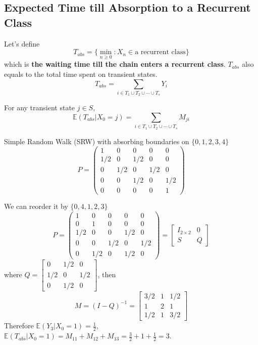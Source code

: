 \documentclass[11pt]{elegantbook}
\begin{document}
\subsection{Expected Time till Absorption to a Recurrent Class}
Let's define $$T_{abs}=\{\min_{n\geq 0}: X_n\in \text{a recurrent class}\}$$
which is \textbf{the waiting time till the chain enters a recurrent class}.
$T_{abs}$ also equals to the total time spent on transient states. $$T_{abs}=\sum_{i\in T_1\cup T_2\cup\cdots\cup T_s}Y_i$$
\begin{corollary}
    For any transient state $j\in S$, $$\mathbb{E}(T_{abs}|X_0=j)=\sum_{i\in T_1\cup T_2\cup\cdots\cup T_s} M_{ji}$$
\end{corollary}
\begin{example}
    Simple Random Walk (SRW) with absorbing boundaries on $\{0,1,2,3,4\}$
    $$P=\left(\begin{array}{ccccc}
    1 & 0 & 0 & 0 & 0 \\
    1 / 2 & 0 & 1 / 2 & 0 & 0 \\
    0 & 1 / 2 & 0 & 1 / 2 & 0 \\
    0 & 0 & 1 / 2 & 0 & 1 / 2 \\
    0 & 0 & 0 & 0 & 1
    \end{array}\right)$$
\end{example}
We can reorder it by $\{0,4,1,2,3\}$
$$P=\left(\begin{array}{ccccc}
    1 & 0 & 0 & 0 & 0 \\
    0 & 1 & 0 & 0 & 0 \\
    1 / 2 & 0 & 0 & 1 / 2 & 0 \\
    0 & 0 & 1 / 2 & 0 & 1 / 2 \\
    0 & 1 / 2 & 0& 1 / 2 & 0
    \end{array}\right)=\begin{bmatrix}
        I_{2\times 2}&	0\\
        S	& Q
    \end{bmatrix}$$
where $Q=\begin{bmatrix}
    0 & 1 / 2 & 0 \\
    1 / 2 & 0 & 1 / 2 \\
    0& 1 / 2 & 0
\end{bmatrix}$, then $$M=(I-Q)^{-1}=\begin{bmatrix}
    3/2 & 1 & 1/2 \\
    1 & 2 & 1 \\
    1/2& 1 & 3/2
\end{bmatrix}$$
Therefore $\mathbb{E}(Y_3|X_0=1)=\frac{1}{2}$, $\mathbb{E}(T_{abs}|X_0=1)=M_{11}+M_{12}+M_{13}=\frac{3}{2}+1+\frac{1}{2}=3$.
\end{document}

